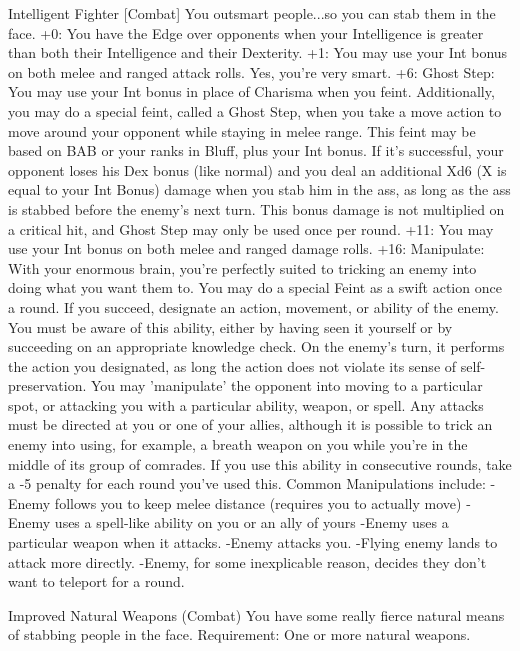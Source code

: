 Intelligent Fighter [Combat]
You outsmart people...so you can stab them in the face.
+0: You have the Edge over opponents when your Intelligence is greater than both their Intelligence and their Dexterity.
+1: You may use your Int bonus on both melee and ranged attack rolls. Yes, you're very smart.
+6: Ghost Step: You may use your Int bonus in place of Charisma when you feint. Additionally, you may do a special feint, called a Ghost Step, when you take a move action to move around your opponent while staying in melee range. This feint may be based on BAB or your ranks in Bluff, plus your Int bonus. If it's successful, your opponent loses his Dex bonus (like normal) and you deal an additional Xd6 (X is equal to your Int Bonus) damage when you stab him in the ass, as long as the ass is stabbed before the enemy's next turn. This bonus damage is not multiplied on a critical hit, and Ghost Step may only be used once per round.
+11: You may use your Int bonus on both melee and ranged damage rolls.
+16: Manipulate: With your enormous brain, you're perfectly suited to tricking an enemy into doing what you want them to. You may do a special Feint as a swift action once a round.
If you succeed, designate an action, movement, or ability of the enemy. You must be aware of this ability, either by having seen it yourself or by succeeding on an appropriate knowledge check. On the enemy's turn, it performs the action you designated, as long the action does not violate its sense of self-preservation.
You may 'manipulate' the opponent into moving to a particular spot, or attacking you with a particular ability, weapon, or spell. Any attacks must be directed at you or one of your allies, although it is possible to trick an enemy into using, for example, a breath weapon on you while you're in the middle of its group of comrades. If you use this ability in consecutive rounds, take a -5 penalty for each round you've used this.
Common Manipulations include:
-Enemy follows you to keep melee distance (requires you to actually move)
-Enemy uses a spell-like ability on you or an ally of yours
-Enemy uses a particular weapon when it attacks.
-Enemy attacks you.
-Flying enemy lands to attack more directly.
-Enemy, for some inexplicable reason, decides they don't want to teleport for a round.


Improved Natural Weapons (Combat)
You have some really fierce natural means of stabbing people in the face.
Requirement:
One or more natural weapons. 

